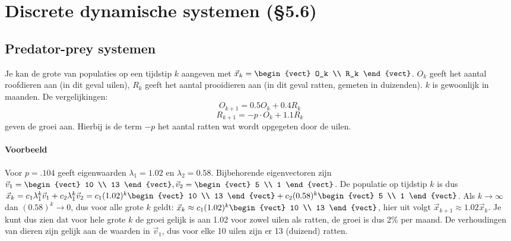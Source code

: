 \section{Discrete dynamische systemen (\S5.6)}
\subsection{Predator-prey systemen}
Je kan de grote van populaties op een tijdstip $k$ aangeven met $\vec{x}_k = \begin{vect} O_k \\ R_k \end{vect}$. $O_k$ geeft het aantal roofdieren aan (in dit geval uilen), $R_k$ geeft het aantal prooidieren aan (in dit geval ratten, gemeten in duizenden). $k$ is gewoonlijk in maanden. De vergelijkingen:
\[ O_{k+1} = 0.5 O_k + 0.4 R_k \]
\[ R_{k+1} = -p \cdot O_k + 1.1 R_k \]
geven de groei aan. Hierbij is de term $-p$ het aantal ratten wat wordt opgegeten door de uilen. 
\paragraph{Voorbeeld} Voor $p = .104$ geeft eigenwaarden $\lambda_1 = 1.02$ en $\lambda_2 = 0.58$. Bijbehorende eigenvectoren zijn $\vec{v}_1 = \begin{vect} 10 \\ 13 \end{vect}, \vec{v}_2 = \begin{vect} 5 \\ 1 \end{vect}$. De populatie op tijdstip $k$ is dus $\vec{x}_k = c_1 \lambda_1^k \vec{v}_1 + c_2 \lambda_1^k\vec{v}_2 = c_1 (1.02)^k \begin{vect} 10 \\ 13 \end{vect} + c_2 (0.58)^k \begin{vect} 5 \\ 1 \end{vect}$. Als $k \to \infty$ dan $(0.58)^k \to 0$, dus voor alle grote $k$ geldt: $\vec{x}_k \approx c_1(1.02)^k \begin{vect} 10 \\ 13 \end{vect}$, hier uit volgt $\vec{x}_{k+1} \approx 1.02 \vec{x}_k$. Je kunt dus zien dat voor hele grote $k$ de groei gelijk is aan 1.02 voor zowel uilen als ratten, de groei is dus 2\% per maand. De verhoudingen van dieren zijn gelijk aan de waarden in $\vec{v}_1$, dus voor elke 10 uilen zijn er 13 (duizend) ratten.

